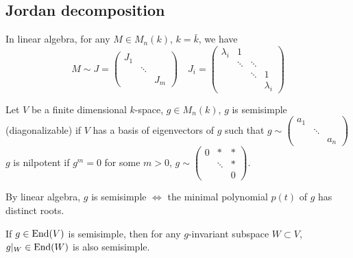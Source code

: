 \subsection*{Jordan decomposition}
In linear algebra, for any $M\in M_n(k)$, $k=\bar{k}$, we have 
\[M \sim J = \begin{pmatrix}
	J_1 & & \\
	& \ddots & \\
	 & & J_m
\end{pmatrix}\quad J_i=\begin{pmatrix}
	\lambda_i & 1 & & \\
	 & \ddots &\ddots & \\
	  & & \ddots &1 \\
	  & & & \lambda_i
\end{pmatrix}\]
\begin{definition}
	Let $V$ be a finite dimensional $k$-space, $g\in M_n(k)$, $g$ is semisimple (diagonalizable) if $V$ has a basis of eigenvectors of $g$ such that $g\sim  \begin{pmatrix}
	a_1 & & \\
	& \ddots & \\
	 & & a_n
\end{pmatrix}$\\
$g$ is nilpotent if $g^m=0$ for some $m>0$, $g\sim  \begin{pmatrix}
	0 &*&*\\
	& \ddots &*\\
	 & & 0
\end{pmatrix}.$\\

\end{definition}
By linear algebra, $g$ is semisimple $\Longleftrightarrow$ the minimal polynomial $p(t)$ of $g$ has distinct roots.

If $g\in \mathrm{End}(V)$ is semisimple, then for any $g$-invariant subspace $W\subset V$, $g|_W \in\mathrm{End}(W)$ is also semisimple.

